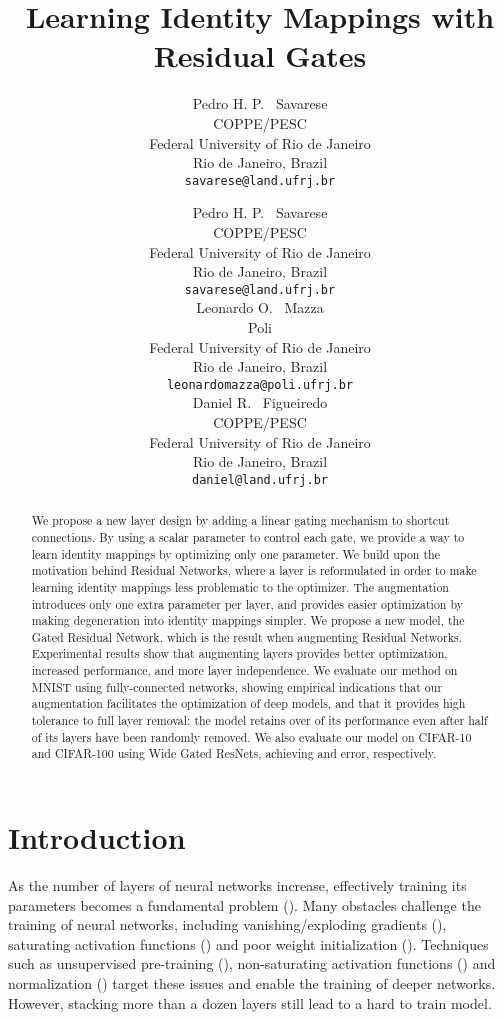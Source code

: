 \documentclass{article} \RequirePackage{amsmath,amsthm,amsfonts,amssymb}
\title{Learning Identity Mappings with Residual Gates}
\author{Pedro H. P. ~Savarese\\
COPPE/PESC\\
Federal University of Rio de Janeiro\\
Rio de Janeiro, Brazil \\
\texttt{savarese@land.ufrj.br} \\
}
\author{Pedro H. P. ~Savarese \\
COPPE/PESC\\
Federal University of Rio de Janeiro\\
Rio de Janeiro, Brazil  \\
\texttt{savarese@land.ufrj.br} \\
\And
Leonardo O. ~Mazza \\
Poli \\
Federal University of Rio de Janeiro \\
Rio de Janeiro, Brazil \\
\texttt{leonardomazza@poli.ufrj.br} \\
\And
Daniel R. ~Figueiredo \\
COPPE/PESC \\
Federal University of Rio de Janeiro \\
Rio de Janeiro, Brazil \\
\texttt{daniel@land.ufrj.br} \\
}
\begin{document}
\maketitle

\begin{abstract}


We propose a new layer design by adding a linear gating mechanism to shortcut connections. By using a scalar parameter to control each gate, we provide a way to learn identity mappings by optimizing only one parameter. We build upon the motivation behind Residual Networks, where a layer is reformulated in order to make learning identity mappings less problematic to the optimizer. The augmentation introduces only one extra parameter per layer, and provides easier optimization by making degeneration into identity mappings simpler. We propose a new model, the Gated Residual Network, which is the result when augmenting Residual Networks. Experimental results show that augmenting layers provides better optimization, increased performance, and more layer independence. We evaluate our method on MNIST using fully-connected networks, showing empirical indications that our augmentation facilitates the optimization of deep models, and that it provides high tolerance to full layer removal: the model retains over  of its performance even after half of its layers have been randomly removed. We also evaluate our model on CIFAR-10 and CIFAR-100 using Wide Gated ResNets, achieving  and  error, respectively.


\end{abstract}












\section{Introduction}
\label{introduction}



As the number of layers of neural networks increase, effectively training its parameters becomes a fundamental problem (\cite{deephard}). Many obstacles challenge the training of neural networks, including vanishing/exploding gradients (\cite{hardtrain}), saturating activation functions (\cite{saturation}) and poor weight initialization (\cite{glorot}). Techniques such as unsupervised pre-training (\cite{aes}), non-saturating activation functions (\cite{relu}) and normalization (\cite{bn}) target these issues and enable the training of deeper networks. However, stacking more than a dozen layers still lead to a hard to train model. 
\end{document}

